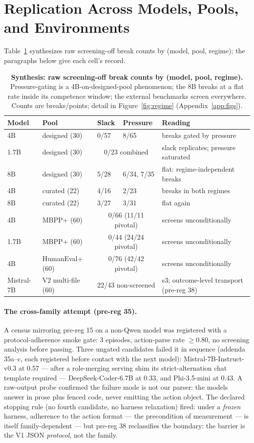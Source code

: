 \documentclass{article}
\theoremstyle{remark}
\begin{document}
\section{Replication Across Models, Pools, and Environments}
\label{app:replication}
Table~\ref{tab:synthesis} synthesizes raw screening-off break counts by
(model, pool, regime); the paragraphs below give each cell's record.
\begin{table}[h]
\centering\scriptsize
\begin{tabular}{lllll}
\toprule
Model & Pool & Slack & Pressure & Reading \\
\midrule
4B & designed (30) & 0/57 & 8/65 & breaks gated by pressure \\
1.7B & designed (30) & \multicolumn{2}{c}{0/23 combined} & slack replicates; pressure saturated \\
8B & designed (30) & 5/28 & 6/34, 7/35 & flat: regime-independent breaks \\
4B & curated (22) & 4/16 & 2/23 & breaks in both regimes \\
8B & curated (22) & 3/27 & 3/31 & flat again \\
4B & MBPP+ (60) & \multicolumn{2}{c}{0/66 (11/11 pivotal)} & screens unconditionally \\
1.7B & MBPP+ (60) & \multicolumn{2}{c}{0/44 (24/24 pivotal)} & screens unconditionally \\
4B & HumanEval+ (60) & \multicolumn{2}{c}{0/76 (42/42 pivotal)} & screens unconditionally \\
Mistral-7B & V2 multi-file (60) & \multicolumn{2}{c}{22/43 non-screened} & s3; outcome-level transport (pre-reg 38) \\
\bottomrule
\end{tabular}
\caption{\textbf{Synthesis: raw screening-off break counts by (model, pool,
regime).} Pressure-gating is a 4B-on-designed-pool phenomenon; the 8B
breaks at a flat rate inside its competence window; the external
benchmarks screen everywhere. Counts are breaks/points; detail in
Figure~\ref{fig:regime} (Appendix~\ref{app:figs}).}
\label{tab:synthesis}
\end{table}

\paragraph{The cross-family attempt (pre-reg 35).} A census mirroring
pre-reg 15 on a non-Qwen model was registered with a protocol-adherence
smoke gate: 3 episodes, action-parse rate $\geq 0.80$, no screening
analysis before passing. Three ungated candidates failed it in sequence
(addenda 35a--c, each registered before contact with the next model):
Mistral-7B-Instruct-v0.3 at 0.57 --- after a role-merging serving shim its
strict-alternation chat template required --- DeepSeek-Coder-6.7B at 0.33,
and Phi-3.5-mini at 0.43. A raw-output probe confirmed the failure mode is
not our parser: the models answer in prose plus fenced code, never
emitting the action object. The declared stopping rule (no fourth
candidate, no harness relaxation) fired: under a \emph{frozen} harness,
adherence to the action format --- the precondition of measurement --- is
itself family-dependent --- but pre-reg 38 reclassifies the boundary:
the barrier is the V1 JSON \emph{protocol}, not the family.
\end{document}
